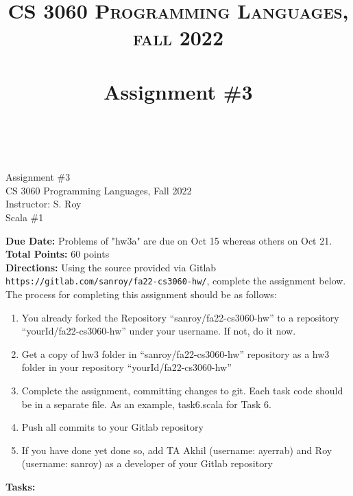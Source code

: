 \documentclass[paper=letter, fontsize=11pt]{scrartcl} %
\title{ 
    \normalfont \normalsize 
    \textsc{CS 3060 Programming Languages, fall 2022} \\ [25pt] %
    \horrule{0.5pt} \\[0.4cm] %
    \huge Assignment \#3 \\ %
    \horrule{2pt} \\[0.5cm] %
}
\begin{document}
    \begin{center}
         Assignment \#3\\
        \small CS 3060 Programming Languages, Fall 2022 \\
        \small Instructor: S. Roy \\
        \huge Scala \#1
    \end{center}
    
    \textbf{Due Date:} Problems of "hw3a" are due on Oct 15 whereas others on Oct 21. \\
    \textbf{Total Points:} 60 points \\


    \textbf{Directions:} Using the source provided via Gitlab \@ \texttt{https://gitlab.com/sanroy/fa22-cs3060-hw/},
complete the assignment below. The process for completing this assignment should be as follows:

    \begin{enumerate}[noitemsep]
        \item You already forked the Repository ``sanroy/fa22-cs3060-hw'' to a repository ``yourId/fa22-cs3060-hw'' under your username. If not, do it now.
        \item Get a copy of hw3 folder in ``sanroy/fa22-cs3060-hw'' repository as a hw3 folder in your repository ``yourId/fa22-cs3060-hw''
        \item Complete the assignment, committing changes to git. Each task code should be in a separate file. As an example, task6.scala for Task 6.
        \item Push all commits to your Gitlab repository
        \item If you have done yet done so, add TA Akhil (username: ayerrab) and Roy (username: sanroy) as a developer of your Gitlab repository
    \end{enumerate}


    \textbf{Tasks:}
\end{document}
